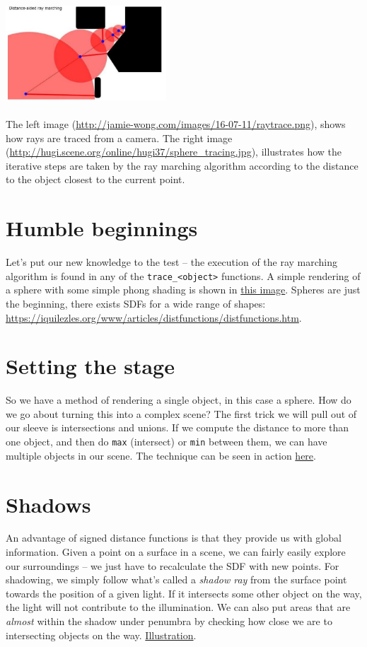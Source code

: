 \documentclass[abstract=off,oneside]{scrreprt}
\begin{document}
\includegraphics[width=0.45\textwidth]{./img/sphere_tracing.jpg}
\\\\
The left image (\url{http://jamie-wong.com/images/16-07-11/raytrace.png}),
shows how rays are traced from a camera. The right image
(\url{http://hugi.scene.org/online/hugi37/sphere_tracing.jpg}), illustrates
how the iterative steps are taken by the ray marching algorithm
according to the distance to the object closest to the current point.

\section*{Humble beginnings}
\label{sec-4}
\label{sec:beginnings}
Let's put our new knowledge to the test -- the execution of the ray
marching algorithm is found in any of the \verb~trace_<object>~
functions. A simple rendering of a sphere with some simple phong
shading is shown in \hyperref[fig:simplesphere]{this image}. Spheres are just the beginning, there
exists SDFs for a wide range of shapes:
\url{https://iquilezles.org/www/articles/distfunctions/distfunctions.htm}.

\section*{Setting the stage}
\label{sec-5}
\label{sec:creatingascene}
So we have a method of rendering a single object, in this case a
sphere. How do we go about turning this into a complex scene? The
first trick we will pull out of our sleeve is intersections and
unions. If we compute the distance to more than one object, and then
do \verb~max~ (intersect) or \verb~min~ between them, we can have multiple
objects in our scene. The technique can be seen in action \hyperref[fig:union]{here}.

\section*{Shadows}
\label{sec-6}
\label{sec:shadows}
An advantage of signed distance functions is that they provide us with
global information. Given a point on a surface in a scene, we can
fairly easily explore our surroundings -- we just have to recalculate
the SDF with new points. For shadowing, we simply follow what's called
a \emph{shadow ray} from the surface point towards the position of a given
light. If it intersects some other object on the way, the light will
not contribute to the illumination. We can also put areas that are
\emph{almost} within the shadow under penumbra by checking how close we are
to intersecting objects on the way. \hyperref[fig:penumbra]{Illustration}.
\end{document}
